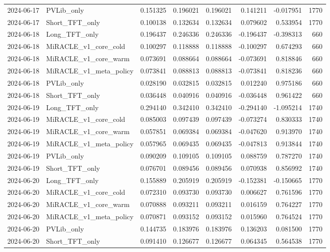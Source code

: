 \begin{tabular}{llrrrrrr}
2024-06-17 & PVLib_only & 0.151325 & 0.196021 & 0.196021 & 0.141211 & -0.017951 & 1770 \\
2024-06-17 & Short_TFT_only & 0.100138 & 0.132634 & 0.132634 & 0.079602 & 0.533954 & 1770 \\
2024-06-18 & Long_TFT_only & 0.196437 & 0.246336 & 0.246336 & -0.196437 & -0.398313 & 660 \\
2024-06-18 & MiRACLE_v1_core_cold & 0.100297 & 0.118888 & 0.118888 & -0.100297 & 0.674293 & 660 \\
2024-06-18 & MiRACLE_v1_core_warm & 0.073691 & 0.088664 & 0.088664 & -0.073691 & 0.818846 & 660 \\
2024-06-18 & MiRACLE_v1_meta_policy & 0.073841 & 0.088813 & 0.088813 & -0.073841 & 0.818236 & 660 \\
2024-06-18 & PVLib_only & 0.028190 & 0.032815 & 0.032815 & 0.012240 & 0.975186 & 660 \\
2024-06-18 & Short_TFT_only & 0.036448 & 0.040916 & 0.040916 & -0.036448 & 0.961422 & 660 \\
2024-06-19 & Long_TFT_only & 0.294140 & 0.342410 & 0.342410 & -0.294140 & -1.095214 & 1740 \\
2024-06-19 & MiRACLE_v1_core_cold & 0.085003 & 0.097439 & 0.097439 & -0.073274 & 0.830333 & 1740 \\
2024-06-19 & MiRACLE_v1_core_warm & 0.057851 & 0.069384 & 0.069384 & -0.047620 & 0.913970 & 1740 \\
2024-06-19 & MiRACLE_v1_meta_policy & 0.057965 & 0.069435 & 0.069435 & -0.047813 & 0.913844 & 1740 \\
2024-06-19 & PVLib_only & 0.090209 & 0.109105 & 0.109105 & 0.088759 & 0.787270 & 1740 \\
2024-06-19 & Short_TFT_only & 0.076701 & 0.089456 & 0.089456 & 0.070938 & 0.856992 & 1740 \\
2024-06-20 & Long_TFT_only & 0.155889 & 0.205919 & 0.205919 & -0.152381 & -0.150665 & 1770 \\
2024-06-20 & MiRACLE_v1_core_cold & 0.072310 & 0.093730 & 0.093730 & 0.006627 & 0.761596 & 1770 \\
2024-06-20 & MiRACLE_v1_core_warm & 0.070888 & 0.093211 & 0.093211 & 0.016159 & 0.764227 & 1770 \\
2024-06-20 & MiRACLE_v1_meta_policy & 0.070871 & 0.093152 & 0.093152 & 0.015960 & 0.764524 & 1770 \\
2024-06-20 & PVLib_only & 0.144735 & 0.183976 & 0.183976 & 0.136203 & 0.081500 & 1770 \\
2024-06-20 & Short_TFT_only & 0.091410 & 0.126677 & 0.126677 & 0.064345 & 0.564538 & 1770 \\

\end{tabular}
